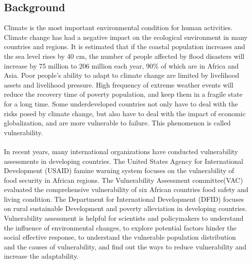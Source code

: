 \documentclass{mcmthesis}
\begin{document}
\subsection{Background}
Climate is the most important environmental condition for human activities.
Climate change has had a negative impact on the ecological environment in 
many countries and regions. It is estimated that if the coastal population 
increases and the sea level rises by 40 cm, the number of people affected by 
flood disasters will increase by 75 million to 206 million each year, 90\% of
which are in Africa and Asia. Poor people's ability to adapt to climate change 
are limited by livelihood assets and livelihood pressure. High frequency of
extreme weather events will reduce the recovery time of poverty population, 
and keep them in a fragile state for a long time. Some underdeveloped 
countries not only have to deal with the risks posed by climate change, 
but also have to deal with the impact of economic globalization, 
and are more vulnerable to failure. This phenomenon is called vulnerability.\\\\
In recent years, many international organizations have conducted vulnerability 
assessments in developing countries. The United States Agency for International
Development (USAID) famine warning system focuses on the vulnerability of 
food security in African regions. The Vulnerability Assessment committee(VAC) 
evaluated the comprehensive vulnerability of six African countries food safety 
and living condition. The Department for International Development (DFID)
focuses on rural sustainable Development and poverty alleviation in developing
countries. Vulnerability assessment is helpful for scientists and 
policymakers to understand the influence of environmental changes, 
to explore potential factors hinder the social effective response, 
to understand the vulnerable population distribution and the causes 
of vulnerability, and find out the ways to reduce vulnerability and 
increase the adaptability.
\end{document}
